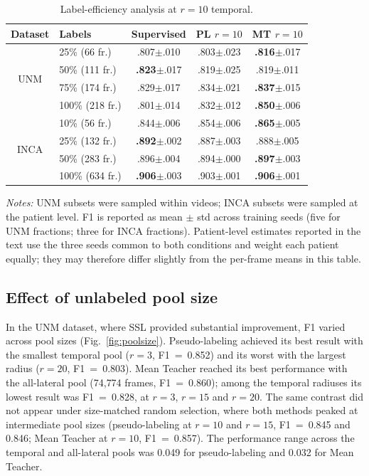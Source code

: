 \documentclass[a4paper,fleqn]{cas-dc}
\begin{document}
\begin{table}[!t]
\centering
\caption{Label-efficiency analysis at $r{=}10$ temporal.}
\label{tab:label_eff}
\footnotesize
\begin{tabular}{@{}clccc@{}}
\toprule
\textbf{Dataset} & \textbf{Labels} & \textbf{Supervised} & \textbf{PL $r{=}10$} & \textbf{MT $r{=}10$} \\
\midrule
\multirow{4}{*}{UNM}
 & 25\% (66 fr.)  & .807$\pm$.010 & .803$\pm$.023 & \textbf{.816}$\pm$.017 \\
 & 50\% (111 fr.) & \textbf{.823}$\pm$.017 & .819$\pm$.025 & .819$\pm$.011 \\
 & 75\% (174 fr.) & .829$\pm$.017 & .834$\pm$.021 & \textbf{.837}$\pm$.015 \\
 & 100\% (218 fr.) & .801$\pm$.014 & .832$\pm$.012 & \textbf{.850}$\pm$.006 \\
\midrule
\multirow{4}{*}{INCA}
 & 10\% (56 fr.)  & .844$\pm$.006 & .854$\pm$.006 & \textbf{.865}$\pm$.005 \\
 & 25\% (132 fr.) & \textbf{.892}$\pm$.002 & .887$\pm$.003 & .888$\pm$.005 \\
 & 50\% (283 fr.) & .896$\pm$.004 & .894$\pm$.000 & \textbf{.897}$\pm$.003 \\
 & 100\% (634 fr.) & \textbf{.906}$\pm$.003 & .903$\pm$.001 & \textbf{.906}$\pm$.001 \\
\bottomrule
\end{tabular}
\medskip
\noindent\begin{minipage}{\linewidth}
\footnotesize\textit{Notes:} UNM subsets were sampled within videos; INCA subsets were sampled at the patient level. F1 is reported as mean $\pm$ std across training seeds (five for UNM fractions; three for INCA fractions). Patient-level estimates reported in the text use the three seeds common to both conditions and weight each patient equally; they may therefore differ slightly from the per-frame means in this table.
\end{minipage}
\end{table}


\subsection{Effect of unlabeled pool size}

In the UNM dataset, where SSL provided substantial improvement, F1 varied across pool sizes (Fig.~\ref{fig:poolsize}).
Pseudo-labeling achieved its best result with the smallest temporal pool ($r{=}3$, F1~=~0.852) and its worst with the largest radius ($r{=}20$, F1~=~0.803).
Mean Teacher reached its best performance with the all-lateral pool (74{,}774 frames, F1~=~0.860); among the temporal radiuses its lowest result was F1~=~0.828, at $r{=}3$, $r{=}15$ and $r{=}20$.
The same contrast did not appear under size-matched random selection, where both methods peaked at intermediate pool sizes (pseudo-labeling at $r{=}10$ and $r{=}15$, F1~=~0.845 and 0.846; Mean Teacher at $r{=}10$, F1~=~0.857).
The performance range across the temporal and all-lateral pools was 0.049 for pseudo-labeling and 0.032 for Mean Teacher.
\end{document}
